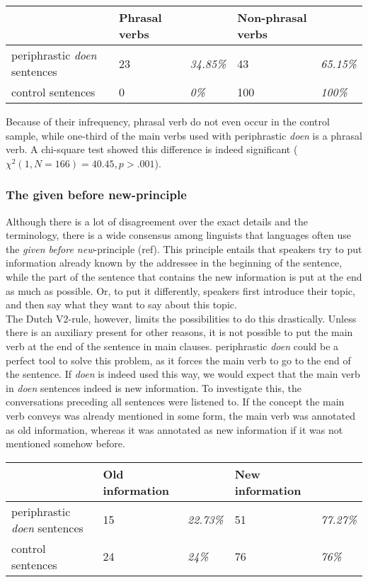 \documentclass[12pt]{article}
\begin{document}
\begin{table}[h]
\begin{tabular}{|l||ll|ll|}
\hline
&Phrasal verbs&&Non-phrasal verbs&\\
\hline
periphrastic \emph{doen} sentences	&23 	& \emph{34.85\%}	&43		 &\emph{65.15\%}\\
control sentences					&0		& \emph{0\%}		&100	 &\emph{100\%}\\
\hline
\end{tabular}
\end{table}

Because of their infrequency, phrasal verb do not even occur in the control sample, while one-third of the main verbs used with periphrastic \emph{doen} is a phrasal verb. A chi-square test showed this difference is indeed significant ($\chi^2(1, N=166) = 40.45, p > .001$).

\subsubsection{The given before new-principle}

Although there is a lot of disagreement over the exact details and the terminology, there is a wide consensus among linguists that languages often use the \emph{given before new}-principle (ref). This principle entails that speakers try to put information already known by the addressee in the beginning of the sentence, while the part of the sentence that contains the new information is put at the end as much as possible. Or, to put it differently, speakers first introduce their topic, and then say what they want to say about this topic.\\\indent
The Dutch V2-rule, however, limits the possibilities to do this drastically. Unless there is an auxiliary present for other reasons, it is not possible to put the main verb at the end of the sentence in main clauses. periphrastic \emph{doen} could be a perfect tool to solve this problem, as it forces the main verb to go to the end of the sentence. If \emph{doen} is indeed used this way, we would expect that the main verb in \emph{doen} sentences indeed is new information. To investigate this, the conversations preceding all sentences were listened to. If the concept the main verb conveys was already mentioned in some form, the main verb was annotated as old information, whereas it was annotated as new information if it was not mentioned somehow before.

\begin{table}[h]
\begin{tabular}{|l||ll|ll|}
\hline
&Old information&&New information&\\
\hline
periphrastic \emph{doen} sentences	&15 	& \emph{22.73\%}	&51		 &\emph{77.27\%}\\
control sentences					&24		& \emph{24\%}		&76		 &\emph{76\%}\\
\hline
\end{tabular}
\end{table}
\end{document}
